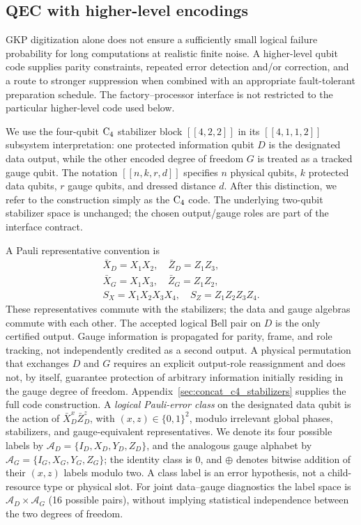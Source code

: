 \documentclass[aps,
prx,
superscriptaddress,
reprint,
longbibliography,
floatfix]{revtex4-2}
\begin{document}
\subsection{QEC with higher-level encodings}

GKP digitization alone does not ensure a sufficiently small logical failure probability for long computations at realistic finite noise. A higher-level qubit code supplies parity constraints, repeated error detection and/or correction, and a route to stronger suppression when combined with an appropriate fault-tolerant preparation schedule. The factory--processor interface is not restricted to the particular higher-level code used below.

We use the four-qubit ${\rm C_4}$ stabilizer block $[[4,2,2]]$ in its $[[4,1,1,2]]$ subsystem interpretation: one protected information qubit $D$ is the designated data output, while the other encoded degree of freedom $G$ is treated as a tracked gauge qubit. The notation $[[n,k,r,d]]$ specifies $n$ physical qubits, $k$ protected data qubits, $r$ gauge qubits, and dressed distance $d$. After this distinction, we refer to the construction simply as the ${\rm C_4}$ code. The underlying two-qubit stabilizer space is unchanged; the chosen output/gauge roles are part of the interface contract.

A Pauli representative convention is
\begin{equation}
\begin{gathered}
\bar X_D=X_1X_2,\quad\bar Z_D=Z_1Z_3,\\
\bar X_G=X_1X_3,\quad\bar Z_G=Z_1Z_2,\\
S_X=X_1X_2X_3X_4,\quad S_Z=Z_1Z_2Z_3Z_4.
\end{gathered}
\label{eq:c4_data_gauge_main}
\end{equation}
These representatives commute with the stabilizers; the data and gauge algebras commute with each other. The accepted logical Bell pair on $D$ is the only certified output. Gauge information is propagated for parity, frame, and role tracking, not independently credited as a second output. A physical permutation that exchanges $D$ and $G$ requires an explicit output-role reassignment and does not, by itself, guarantee protection of arbitrary information initially residing in the gauge degree of freedom. Appendix~\ref{sec:concat_c4_stabilizers} supplies the full code construction.
A \emph{logical Pauli-error class} on the designated data qubit is the action of $\bar X_D^{x}\bar Z_D^{z}$, with $(x,z)\in\{0,1\}^2$, modulo irrelevant global phases, stabilizers, and gauge-equivalent representatives. We denote its four possible labels by $\mathcal A_D=\{I_D,X_D,Y_D,Z_D\}$, and the analogous gauge alphabet by $\mathcal A_G=\{I_G,X_G,Y_G,Z_G\}$; the identity class is $0$, and $\oplus$ denotes bitwise addition of their $(x,z)$ labels modulo two. A class label is an error hypothesis, not a child-resource type or physical slot. For joint data--gauge diagnostics the label space is $\mathcal A_D\times\mathcal A_G$ (16 possible pairs), without implying statistical independence between the two degrees of freedom.
\end{document}
